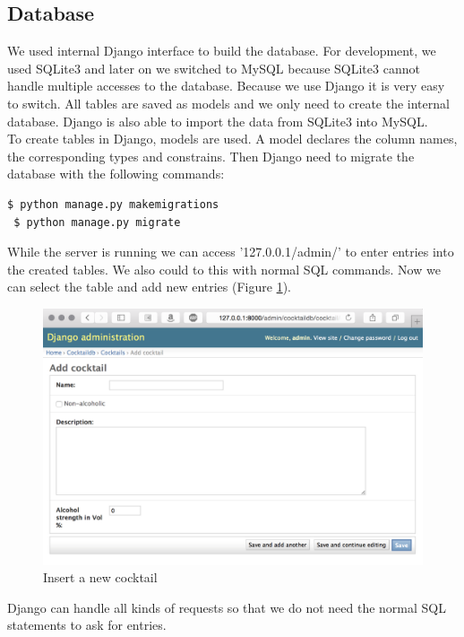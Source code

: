 \documentclass{acm_proc_article-sp}
\begin{document}
\subsection{Database}
We used internal Django interface to build the database. For development, we used SQLite3 and later on we switched to MySQL because SQLite3 cannot handle multiple accesses to the database. Because we use Django it is very easy to switch. All tables are saved as models and we only need to create the internal database. Django is also able to import the data from SQLite3 into MySQL. \\
To create tables in Django, models are used. A model declares the column names, the corresponding types and constrains. Then Django need to migrate the database with the following commands:
\begin{lstlisting}[language=bash]
 $ python manage.py makemigrations
 $ python manage.py migrate
\end{lstlisting}
While the server is running we can access '127.0.0.1/admin/' to enter entries into the created tables. We also could to this with normal SQL commands. Now we can select the table and add new entries (Figure \ref{fig:db_entry}). \\
\begin{figure}[htbp] 
 \centering
    \includegraphics[width=0.7\linewidth]{pictures/db_insert_entry.png}
 \caption{Insert a new cocktail}
 \label{fig:db_entry}
\end{figure}
Django can handle all kinds of requests so that we do not need the normal SQL statements to ask for entries.
\end{document}
